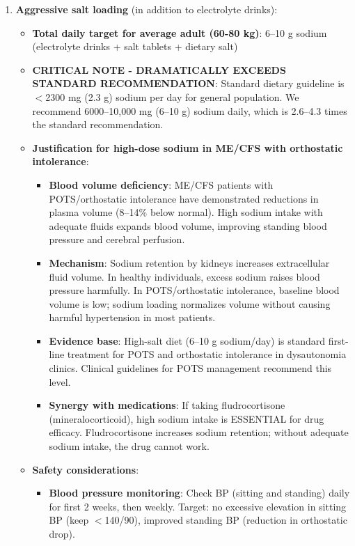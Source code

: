 \begin{enumerate}
    \item \textbf{Aggressive salt loading} (in addition to electrolyte drinks):
    \begin{itemize}
        \item \textbf{Total daily target for average adult (60-80 kg)}: 6--10 g sodium (electrolyte drinks + salt tablets + dietary salt)
        \item \textbf{CRITICAL NOTE - DRAMATICALLY EXCEEDS STANDARD RECOMMENDATION}: Standard dietary guideline is $<$2300 mg (2.3 g) sodium per day for general population. We recommend 6000--10{,}000 mg (6--10 g) sodium daily, which is 2.6--4.3 times the standard recommendation.
        \item \textbf{Justification for high-dose sodium in ME/CFS with orthostatic intolerance}:
        \begin{itemize}
            \item \textbf{Blood volume deficiency}: ME/CFS patients with POTS/orthostatic intolerance have demonstrated reductions in plasma volume (8--14\% below normal). High sodium intake with adequate fluids expands blood volume, improving standing blood pressure and cerebral perfusion.
            \item \textbf{Mechanism}: Sodium retention by kidneys increases extracellular fluid volume. In healthy individuals, excess sodium raises blood pressure harmfully. In POTS/orthostatic intolerance, baseline blood volume is low; sodium loading normalizes volume without causing harmful hypertension in most patients.
            \item \textbf{Evidence base}: High-salt diet (6--10 g sodium/day) is standard first-line treatment for POTS and orthostatic intolerance in dysautonomia clinics. Clinical guidelines for POTS management recommend this level.
            \item \textbf{Synergy with medications}: If taking fludrocortisone (mineralocorticoid), high sodium intake is ESSENTIAL for drug efficacy. Fludrocortisone increases sodium retention; without adequate sodium intake, the drug cannot work.
        \end{itemize}
        \item \textbf{Safety considerations}:
        \begin{itemize}
            \item \textbf{Blood pressure monitoring}: Check BP (sitting and standing) daily for first 2 weeks, then weekly. Target: no excessive elevation in sitting BP (keep $<$140/90), improved standing BP (reduction in orthostatic drop).

\end{itemize}
\end{itemize}
\end{enumerate}
